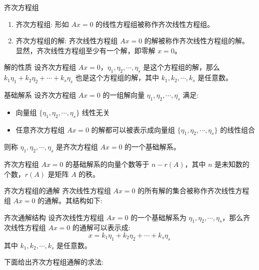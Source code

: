 \documentclass[a4paper,12pt]{ctexart}
\begin{document}
\begin{mydef}{齐次方程组}{}
\begin{enumerate}
    \item 齐次方程组: 形如 $Ax=0$ 的线性方程组被称作齐次线性方程组。
    \item 齐次方程组的解: 齐次线性方程组 $Ax=0$ 的解被称作齐次线性方程组的解。显然，齐次线性方程组至少有一个解，即零解 $x=0$。
\end{enumerate}
\end{mydef}

\begin{myprop}{解的性质}{}
    设齐次方程组 $Ax=0$，$\eta_1, \eta_2, \cdots, \eta_s$ 是这个方程组的解，那么 $k_1 \eta_1 + k_2 \eta_2 + \cdots + k_s \eta_s$ 也是这个方程组的解，其中 $k_1, k_2, \cdots , k_s$ 是任意数。
\end{myprop}

\begin{mythm}{基础解系}{}
    设齐次方程组 $Ax=0$ 的一组解向量 $\eta_1, \eta_2, \cdots, \eta_s$ 满足:
    \begin{itemize}
        \item 向量组 $\{\eta_1, \eta_2, \cdots, \eta_s\}$ 线性无关
        \item 任意齐次方程组 $Ax=0$ 的解都可以被表示成向量组 $\{\eta_1, \eta_2, \cdots, \eta_s\}$ 的线性组合
    \end{itemize}
    则称 $\eta_1, \eta_2, \cdots, \eta_s$ 是齐次方程组 $Ax=0$ 的一个基础解系。
\end{mythm}

\begin{mythm}{}{}
    齐次方程组 $Ax=0$ 的基础解系的向量个数等于 $n - r(A)$，其中 $n$ 是未知数的个数，$r(A)$ 是矩阵 $A$ 的秩。
\end{mythm}

\begin{mydef}{齐次方程组的通解}{}
    齐次线性方程组 $Ax=0$ 的所有解的集合被称作齐次线性方程组 $Ax=0$ 的通解。其结构如下:
\end{mydef}

\begin{mythm}{齐次通解结构}{}
    设齐次线性方程组 $Ax=0$ 的一个基础解系为 $\eta_1, \eta_2, \cdots, \eta_s$，那么齐次线性方程组 $Ax=0$ 的通解可以表示成:
    \[
    x = k_1 \eta_1 + k_2 \eta_2 + \cdots + k_s \eta_s
    \]
    其中 $k_1, k_2, \cdots , k_s$ 是任意数。
\end{mythm}

下面给出齐次方程组通解的求法:
\end{document}
